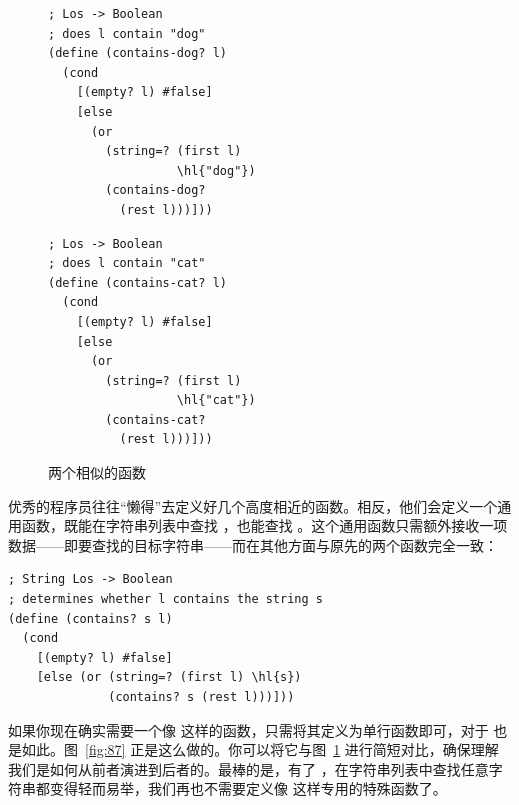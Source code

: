 \begin{figure}[htbp]
  \centering
  \begin{stepperbox}[unbreakable]
    \noindent\begin{minipage}[t]{0.48\linewidth}\vspace{0pt}
\begin{Verbatim}[commandchars=\\\{\}, fontsize=\fontsize{6.0pt}{7.2pt}\selectfont]
; Los -> Boolean
; does l contain "dog"
(define (contains-dog? l)
  (cond
    [(empty? l) #false]
    [else
      (or
        (string=? (first l)
                  \hl{"dog"})
        (contains-dog?
          (rest l)))]))
\end{Verbatim}
    \end{minipage}\hfill
    \begin{minipage}[t]{0.48\linewidth}\vspace{0pt}
\begin{Verbatim}[commandchars=\\\{\}, fontsize=\fontsize{6.0pt}{7.2pt}\selectfont]
; Los -> Boolean
; does l contain "cat"
(define (contains-cat? l)
  (cond
    [(empty? l) #false]
    [else
      (or
        (string=? (first l)
                  \hl{"cat"})
        (contains-cat?
          (rest l)))]))
\end{Verbatim}
    \end{minipage}
  \end{stepperbox}
  \caption{两个相似的函数}
  \label{fig:86}
\end{figure}

优秀的程序员往往“懒得”去定义好几个高度相近的函数。相反，他们会定义一个通用函数，既能在字符串列表中查找 ，也能查找 。这个通用函数只需额外接收一项数据——即要查找的目标字符串——而在其他方面与原先的两个函数完全一致：

\begin{stepperbox}
\begin{Verbatim}[commandchars=\\\{\}, fontsize=\footnotesize]
; String Los -> Boolean
; determines whether l contains the string s
(define (contains? s l)
  (cond
    [(empty? l) #false]
    [else (or (string=? (first l) \hl{s})
              (contains? s (rest l)))]))
\end{Verbatim}
\end{stepperbox}

如果你现在确实需要一个像  这样的函数，只需将其定义为单行函数即可，对于  也是如此。图~\ref{fig:87} 正是这么做的。你可以将它与图~\ref{fig:86} 进行简短对比，确保理解我们是如何从前者演进到后者的。最棒的是，有了 ，在字符串列表中查找任意字符串都变得轻而易举，我们再也不需要定义像  这样专用的特殊函数了。

